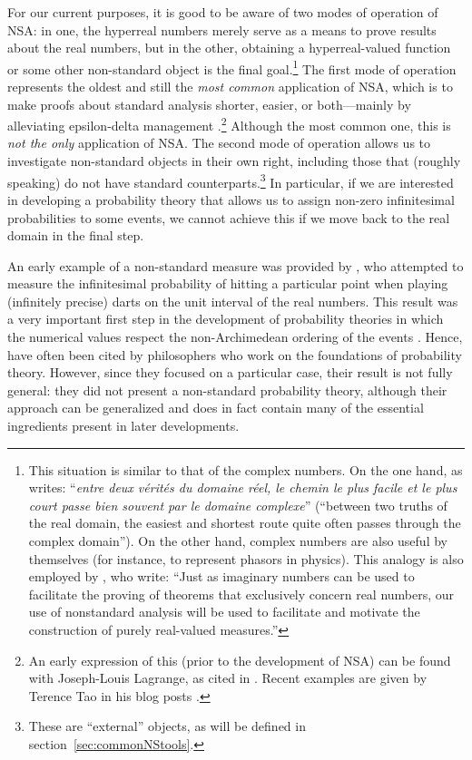 For our current purposes, it is good to be aware of two modes of operation of NSA: in one, the hyperreal numbers merely serve as a means to prove results about the real numbers, but in the other, obtaining a hyperreal-valued function or some other non-standard object is the final goal.\footnote{This situation is similar to that of the complex numbers. On the one hand, as \citet[pp.~1--2]{Painleve:1967} writes: ``\textit{entre deux v{\'e}rit{\'e}s du domaine r{\'e}el, le chemin le plus facile et le plus court passe bien souvent par le domaine complexe}'' (``between two truths of the real domain, the easiest and shortest route quite often passes through the complex domain''). On the other hand, complex numbers are also useful by themselves (for instance, to represent phasors in physics).
This analogy is also employed by \citet[p.~416]{BarthaHitchcock:1999}, who write: ``Just as imaginary numbers can be used to facilitate the proving of theorems that exclusively concern real numbers, our use of nonstandard analysis will be used to facilitate and motivate the construction of purely real-valued measures.''}
The first mode of operation represents the oldest and still the \emph{most common} application of NSA, which is to make proofs about standard analysis shorter, easier, or both---mainly by alleviating epsilon-delta management \citep{Tao:2007}.\footnote{An early expression of this (prior to the development of NSA) can be found with Joseph-Louis Lagrange, as cited in \citet[p.~63]{Blaszczyk_etal:2013}. Recent examples are given by Terence Tao in his blog posts \citep[see, \textit{e.g.},][]{Tao:2007-2012}.} Although the most common one, this is \emph{not the only} application of NSA.
The second mode of operation allows us to investigate non-standard objects in their own right, including those that (roughly speaking) do not have standard counterparts.\footnote{These are ``external'' objects, as will be defined in section~\ref{sec:commonNStools}.} In particular, if we are interested in developing a probability theory that allows us to assign non-zero infinitesimal probabilities to some events, we cannot achieve this if we move back to the real domain in the final step.

An early example of a non-standard measure was provided by \citet{BernsteinWattenberg:1969}, who attempted to measure the infinitesimal probability of hitting a particular point when playing (infinitely precise) darts on the unit interval of the real numbers. This result was a very important first step in the development of probability theories in which the numerical values respect the non-Archimedean ordering of the events \citep[as studied by~][]{deFinetti:1936}. Hence, \citet{BernsteinWattenberg:1969} have often been cited by philosophers who work on the foundations of probability theory. However, since they focused on a particular case, their result is not fully general: they did not present a non-standard probability theory, although their approach can be generalized and does in fact contain many of the essential ingredients present in later developments.

